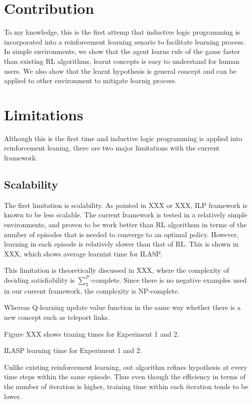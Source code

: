 \section{Contribution}
\label{contribution}

To my knowledge, this is the first attemp that inductive logic programming is incorporated into a reinforcement learning senario to facilitate learning process.
In simple environments, we show that the agent learns rule of the game faster than existing RL algorithms, learnt concepts is easy to understand for human users.
We also show that the learnt hypothesis is general concept and can be applied to other environment to mitigate learnig process.

\section{Limitations}

Although this is the first time and inductive logic programming is applied into reinforcement leaning, 
there are two major limitations with the current framework.

\subsection{Scalability}
The first limitation is scalability. As pointed in XXX or XXX,
ILP framework is known to be less scalable. The current framework is tested in a relatively simple environments, 
and proven to be work better than RL algorithsm in terms of the number of episodes that is needed to converge to an optimal policy.
However, learning in each episode is relatively slower than that of RL. 
This is shown in XXX, which shows average learnint time for ILASP. 

This limitation is theoretically discussed in XXX, where the complexity of deciding satisfiability is 
$\sum_{2}^{P}$-complete. Since there is no negative examples used in our current framework, the complexity is NP-complete.

Whereas Q-learning update value function in the same way whether there is a new concept such as teleport links.

Figure XXX shows traning times for Experiment 1 and 2.

ILASP learning time for Experiment 1 and 2. 

Unlike existing reinforcement learning,
out algorithm refines hypothesis at every time steps within the same episode.
Thus even though the efficiency in terms of the number of iteration is higher,
training time within each iteration tends to be lower.

